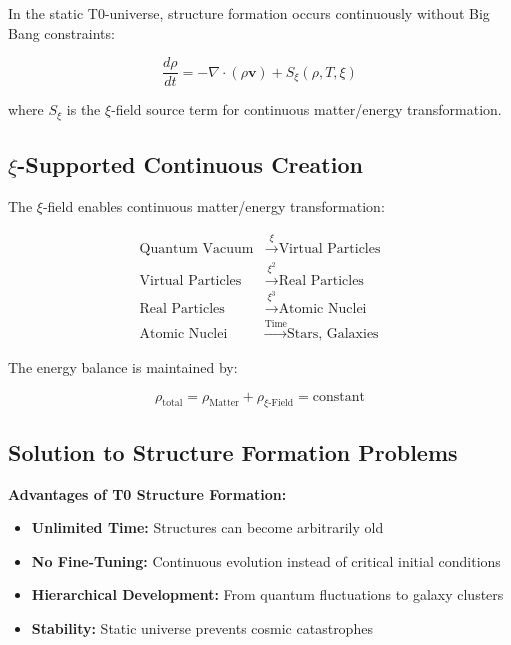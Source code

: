 \documentclass[12pt,a4paper]{article}
\newcommand{\xipar}{\xi}
\begin{document}
	In the static T0-universe, structure formation occurs continuously without Big Bang constraints:
	
	\begin{equation}
		\frac{d\rho}{dt} = -\nabla \cdot (\rho \mathbf{v}) + S_\xi(\rho, T, \xipar)
	\end{equation}
	
	where $S_\xi$ is the $\xi$-field source term for continuous matter/energy transformation.
	
	\subsection{$\xi$-Supported Continuous Creation}
	
	The $\xi$-field enables continuous matter/energy transformation:
	
	\begin{align}
		\text{Quantum Vacuum} &\xrightarrow{\xipar} \text{Virtual Particles} \\
		\text{Virtual Particles} &\xrightarrow{\xipar^2} \text{Real Particles} \\
		\text{Real Particles} &\xrightarrow{\xipar^3} \text{Atomic Nuclei} \\
		\text{Atomic Nuclei} &\xrightarrow{\text{Time}} \text{Stars, Galaxies}
	\end{align}
	
	The energy balance is maintained by:
	
	\begin{equation}
		\rho_{\text{total}} = \rho_{\text{Matter}} + \rho_{\xi\text{-Field}} = \text{constant}
	\end{equation}
	
	\subsection{Solution to Structure Formation Problems}
	
	\begin{keyresult}
		\textbf{Advantages of T0 Structure Formation:}
		
		\begin{itemize}
			\item \textbf{Unlimited Time:} Structures can become arbitrarily old
			\item \textbf{No Fine-Tuning:} Continuous evolution instead of critical initial conditions
			\item \textbf{Hierarchical Development:} From quantum fluctuations to galaxy clusters
			\item \textbf{Stability:} Static universe prevents cosmic catastrophes
		\end{itemize}
	\end{keyresult}
	
\end{document}
